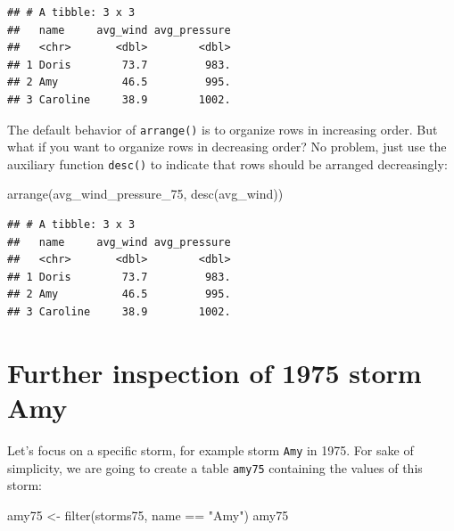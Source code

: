 \documentclass[
]{book}
\newenvironment{Shaded}{\begin{snugshade}}{\end{snugshade}}
\newcommand{\FunctionTok}[1]{\textcolor[rgb]{0.00,0.00,0.00}{#1}}
\newcommand{\NormalTok}[1]{#1}
\newcommand{\OtherTok}[1]{\textcolor[rgb]{0.56,0.35,0.01}{#1}}
\newcommand{\SpecialCharTok}[1]{\textcolor[rgb]{0.00,0.00,0.00}{#1}}
\newcommand{\StringTok}[1]{\textcolor[rgb]{0.31,0.60,0.02}{#1}}
\begin{document}
\begin{verbatim}
## # A tibble: 3 x 3
##   name     avg_wind avg_pressure
##   <chr>       <dbl>        <dbl>
## 1 Doris        73.7         983.
## 2 Amy          46.5         995.
## 3 Caroline     38.9        1002.
\end{verbatim}

The default behavior of \texttt{arrange()} is to organize rows in increasing order.
But what if you want to organize rows in decreasing order? No problem, just
use the auxiliary function \texttt{desc()} to indicate that rows should be arranged
decreasingly:

\begin{Shaded}
\begin{Highlighting}[]
\FunctionTok{arrange}\NormalTok{(avg\_wind\_pressure\_75, }\FunctionTok{desc}\NormalTok{(avg\_wind))}
\end{Highlighting}
\end{Shaded}

\begin{verbatim}
## # A tibble: 3 x 3
##   name     avg_wind avg_pressure
##   <chr>       <dbl>        <dbl>
## 1 Doris        73.7         983.
## 2 Amy          46.5         995.
## 3 Caroline     38.9        1002.
\end{verbatim}

\hypertarget{further-inspection-of-1975-storm-amy}{%
\section{Further inspection of 1975 storm Amy}\label{further-inspection-of-1975-storm-amy}}

Let's focus on a specific storm, for example storm \texttt{Amy} in 1975. For sake of
simplicity, we are going to create a table \texttt{amy75} containing the values of
this storm:

\begin{Shaded}
\begin{Highlighting}[]
\NormalTok{amy75 }\OtherTok{\textless{}{-}} \FunctionTok{filter}\NormalTok{(storms75, name }\SpecialCharTok{==} \StringTok{"Amy"}\NormalTok{)}
\NormalTok{amy75}
\end{Highlighting}
\end{Shaded}
\end{document}
